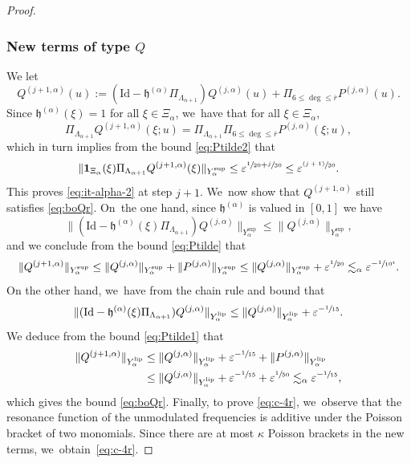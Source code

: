 \documentclass[JEP,XML,SOM,Unicode,published]{cedram}
\newcommand{\psfrac}[2]{\sfrac{(#1)}{#2}}
\theoremstyle{plain}
\theoremstyle{definition}
\newcommand{\1}{\mathbf{1}}
\newcommand{\Ysup}[1]{Y_{#1}^{\mathrm{sup}}}
\newcommand{\Ylip}[1]{Y_{#1}^{\mathrm{lip}}}
\let\epsilon\varepsilon
\begin{document}
\begin{proof}
\subsubsection*{New terms of type $Q$}
We let
\[
Q^{(j+1,\alpha)}(u) := (\mathrm{Id}-\mathfrak{h}^{(\alpha)}\Pi_{\Lambda_{\alpha+1}})Q^{(j,\alpha)}(u) + \Pi_{6\leq\deg\leq\overline{r}}P^{(j,\alpha)}(u).
\]
Since $\mathfrak{h}^{(\alpha)}(\xi)=1$ for all $\xi\in\Xi_{\alpha}$, we~have that for all $\xi\in\Xi_{\alpha}$,
\[
\Pi_{\Lambda_{\alpha+1}}Q^{(j+1,\alpha)}(\xi;u)
= \Pi_{{\Lambda}_{\alpha+1}}\Pi_{6\leq\deg\leq\overline{r}}P^{(j,\alpha)}(\xi;u),
\]
which in turn implies from the bound \eqref{eq:Ptilde2} that
\[
\|\mathbf{1}_{\Xi_{\alpha}}(\xi)\Pi_{\Lambda_{\alpha+1}}Q^{(j+1,\alpha)}(\xi) \|_{\Ysup{\alpha}}
\leq \epsilon^{\sfrac{1}{20}+\sfrac{j}{30}} \leq \epsilon^{\psfrac{j+1}{30}}.
\]
This proves \eqref{eq:it-alpha-2} at step $j+1$. We~now show that $Q^{(j+1,\alpha)}$ still satisfies \eqref{eq:boQr}. On~the one hand, since $\mathfrak{h}^{(\alpha)}$ is valued in $[0,1]$ we have
\[
\|(\mathrm{Id}-\mathfrak{h}^{(\alpha)}(\xi)\Pi_{\Lambda_{\alpha+1}})Q^{(j,\alpha)}\|_{\Ysup{\alpha}} \leq \|Q^{(j,\alpha)}\|_{\Ysup{\alpha}},
\]
and we conclude from the bound \eqref{eq:Ptilde} that
\[
\|Q^{(j+1,\alpha)}\|_{\Ysup{\alpha}}
\leq \|Q^{(j,\alpha)}\|_{\Ysup{\alpha}}
+\|P^{(j,\alpha)}\|_{\Ysup{\alpha}}
\leq
\|Q^{(j,\alpha)}\|_{\Ysup{\alpha}} + \epsilon^{\sfrac{1}{20}} \lesssim_{\alpha}\epsilon^{-\sfrac{1}{10^{4}}}.
\]
On the other hand, we~have from the chain rule and bound that
\[
\|(\mathrm{Id}-\mathfrak{h}^{(\alpha)}(\xi)\Pi_{\Lambda_{\alpha+1}})Q^{(j,\alpha)}\|_{\Ylip{\alpha}}
\leq \|Q^{(j,\alpha)}\|_{\Ylip{\alpha}}
+ \epsilon^{-\sfrac{1}{15}}.
\]
We deduce from the bound \eqref{eq:Ptilde1} that
\begin{align*}
\|Q^{(j+1,\alpha)}\|_{\Ylip{\alpha}} &\leq \|Q^{(j,\alpha)}\|_{\Ylip{\alpha}}
+ \epsilon^{-\sfrac{1}{15}} + \|P^{(j,\alpha)}\|_{\Ylip{\alpha}}\\
&\leq
\|Q^{(j,\alpha)}\|_{\Ylip{\alpha}}
+
\epsilon^{-\sfrac{1}{15}}
+
\epsilon^{\sfrac{1}{50}} \lesssim_{\alpha}\epsilon^{-\sfrac{1}{15}},
\end{align*}
which gives the bound \eqref{eq:boQr}. Finally, to prove \eqref{eq:c-4r}, we~observe that the resonance function of the unmodulated frequencies is additive under the Poisson bracket of two monomials. Since there are at most $\kappa$ Poisson brackets in the new terms, we~obtain~\eqref{eq:c-4r}.


\end{proof}
\end{document}
